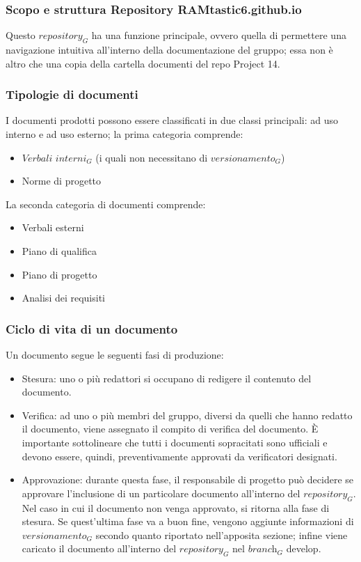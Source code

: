 \subsubsection{Scopo e struttura Repository RAMtastic6.github.io}
Questo $\textit{repository}_G$ ha una funzione principale, ovvero quella di permettere una navigazione intuitiva all'interno della documentazione del gruppo; essa non è altro che una copia della cartella documenti del repo Project 14.

\subsubsection{Tipologie di documenti}
I documenti prodotti possono essere classificati in due classi principali: ad uso interno e ad uso esterno; la prima categoria comprende:
\begin{itemize}
    \item $\textit{Verbali interni}_G$ (i quali non necessitano di $\textit{versionamento}_G$)
    \item Norme di progetto
\end{itemize}
La seconda categoria di documenti comprende:
\begin{itemize}
    \item Verbali esterni
    \item Piano di qualifica
    \item Piano di progetto
    \item Analisi dei requisiti
\end{itemize}
\subsubsection{Ciclo di vita di un documento}
Un documento segue le seguenti fasi di produzione:
\begin{itemize}
    \item Stesura: uno o più redattori si occupano di redigere il contenuto del documento.
    \item Verifica: ad uno o più membri del gruppo, diversi da quelli che hanno redatto il documento, viene assegnato il compito di verifica del documento.
È importante sottolineare che tutti i documenti sopracitati sono ufficiali e devono essere, quindi, preventivamente approvati da verificatori designati.
    \item Approvazione: durante questa fase, il responsabile di progetto può decidere se approvare l'inclusione di un particolare documento all'interno del $\textit{repository}_G$. Nel caso in cui il documento non venga approvato, si ritorna alla fase di stesura.
    Se quest'ultima fase va a buon fine, vengono aggiunte informazioni di $\textit{versionamento}_G$ secondo quanto riportato nell'apposita sezione; infine viene caricato il documento all'interno del $\textit{repository}_G$ nel $\textit{branch}_G$ develop.
\end{itemize}
